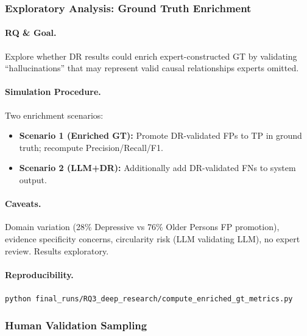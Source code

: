 \subsubsection{Exploratory Analysis: Ground Truth Enrichment}
\label{sec:gt_enrichment_method}

\paragraph{RQ \& Goal.}
Explore whether DR results could enrich expert-constructed GT by validating ``hallucinations'' that may represent valid causal relationships experts omitted.

\paragraph{Simulation Procedure.}
Two enrichment scenarios:
\begin{itemize}[noitemsep]
    \item \textbf{Scenario 1 (Enriched GT):} Promote DR-validated FPs to TP in ground truth; recompute Precision/Recall/F1.
    \item \textbf{Scenario 2 (LLM+DR):} Additionally add DR-validated FNs to system output.
\end{itemize}

\paragraph{Caveats.}
Domain variation (28\% Depressive vs 76\% Older Persons FP promotion), evidence specificity concerns, circularity risk (LLM validating LLM), no expert review. Results exploratory.

\paragraph{Reproducibility.}
\texttt{python final\_runs/RQ3\_deep\_research/compute\_enriched\_gt\_metrics.py}

\subsubsection{Human Validation Sampling}
\label{sec:rq3_human_validation}


